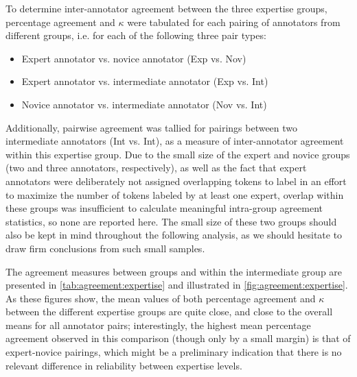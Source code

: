 	To determine inter-annotator agreement between the three expertise groups, percentage agreement and $\kappa$ were tabulated for each pairing of annotators from different groups, i.e. for each of the following three pair types:
	\begin{itemize}[topsep=-1em]
	\item{Expert annotator vs. novice annotator (Exp vs. Nov)}
	\item{Expert annotator vs. intermediate annotator (Exp vs. Int)}
	\item{Novice annotator vs. intermediate annotator (Nov vs. Int)}
	\end{itemize}
	Additionally, pairwise agreement was tallied for pairings between two intermediate annotators (Int vs. Int), as a measure of inter-annotator agreement within this expertise group. Due to the small size of the expert and novice groups (two and three annotators, respectively), as well as the fact that expert annotators were deliberately not assigned overlapping tokens to label in an effort to maximize the number of tokens labeled by at least one expert,
	overlap within these groups was insufficient to calculate meaningful intra-group agreement statistics, so none are reported here. The small size of these two groups should also be kept in mind throughout the following analysis, as we should hesitate to draw firm conclusions from such small samples. 
		
		The agreement measures between groups and within the intermediate group are presented in \cref{tab:agreement:expertise} and illustrated in \cref{fig:agreement:expertise}. As these figures show, the mean values of both percentage agreement and $\kappa$ between the different expertise groups are quite close, and close to the overall means for all annotator pairs; 
		interestingly, the highest mean percentage agreement observed in this comparison (though only by a small margin) is that of expert-novice pairings, which might be a preliminary indication that there is no relevant difference in reliability between expertise levels. 
			
		
		
